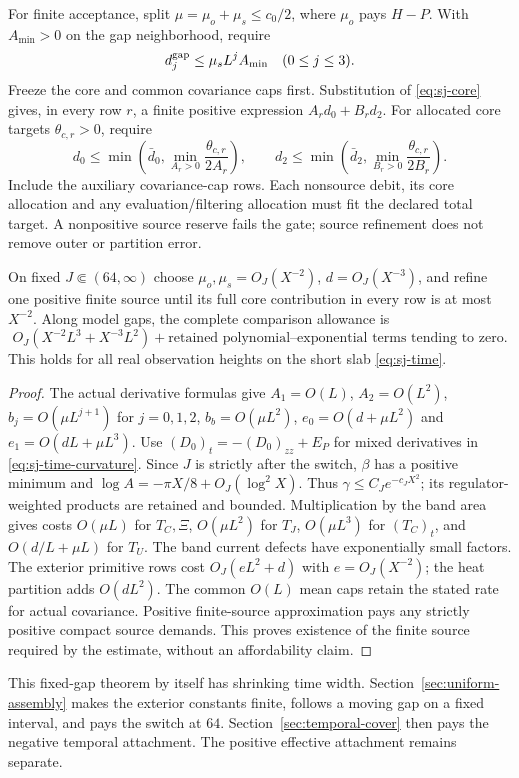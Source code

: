 For finite acceptance, split $\mu=\mu_o+\mu_s\le c_0/2$, where
$\mu_o$ pays $H-P$. With $A_{\min}>0$ on the gap neighborhood, require
\begin{equation}
 d_j^{\rm gap}\le\mu_sL^j A_{\min}\quad(0\le j\le3).
 \label{eq:sj-source-gap}
\end{equation}
Freeze the core and common covariance caps first. Substitution of
\eqref{eq:sj-core} gives, in every row $r$, a finite positive expression
$A_rd_0+B_rd_2$. For allocated core targets $\theta_{c,r}>0$, require
\begin{equation}
 d_0\le\min\left(\bar d_0,\min_{A_r>0}\frac{\theta_{c,r}}{2A_r}\right),
 \qquad
 d_2\le\min\left(\bar d_2,\min_{B_r>0}\frac{\theta_{c,r}}{2B_r}\right).
 \label{eq:sj-source-core}
\end{equation}
Include the auxiliary covariance-cap rows. Each nonsource debit, its
core allocation and any evaluation/filtering allocation must fit the
declared total target. A nonpositive source reserve fails the gate;
source refinement does not remove outer or partition error.

\begin{corollary}\label{cor:sj-rate}
On fixed $J\Subset(64,\infty)$ choose $\mu_o,\mu_s=O_J(X^{-2})$,
$d=O_J(X^{-3})$, and refine one positive finite source until its full
core contribution in every row is at most $X^{-2}$. Along model gaps,
the complete comparison allowance is
\begin{equation}
 O_J(X^{-2}L^3+X^{-3}L^2)
       +\text{retained polynomial--exponential terms tending to zero}.
 \label{eq:sj-rate}
\end{equation}
This holds for all real observation heights on the short slab
\eqref{eq:sj-time}.
\end{corollary}
\begin{proof}
The actual derivative formulas give
$A_1=O(L)$, $A_2=O(L^2)$,
$b_j=O(\mu L^{j+1})$ for $j=0,1,2$,
$b_b=O(\mu L^2)$, $e_0=O(d+\mu L^2)$ and
$e_1=O(dL+\mu L^3)$. Use
$(D_0)_t=-(D_0)_{zz}+E_P$ for mixed derivatives in
\eqref{eq:sj-time-curvature}. Since $J$ is strictly after the switch,
$\beta$ has a positive minimum and
$\log A=-\pi X/8+O_J(\log^2X)$. Thus
$\gamma\le C_Je^{-c_JX^2}$; its regulator-weighted products are
retained and bounded. Multiplication by the band area gives costs
$O(\mu L)$ for $T_C,\Xi$, $O(\mu L^2)$ for $T_J$,
$O(\mu L^3)$ for $(T_C)_t$, and $O(d/L+\mu L)$ for $T_U$.
The band current defects have exponentially small factors. The exterior
primitive rows cost $O_J(eL^2+d)$ with $e=O_J(X^{-2})$; the heat
partition adds $O(dL^2)$. The common $O(L)$ mean caps retain the stated
rate for actual covariance. Positive finite-source approximation pays
any strictly positive compact source demands. This proves existence
of the finite source required by the estimate, without an affordability
claim.
\end{proof}
This fixed-gap theorem by itself has shrinking time width.
Section~\ref{sec:uniform-assembly} makes the exterior constants finite,
follows a moving gap on a fixed interval, and pays the switch at $64$.
Section~\ref{sec:temporal-cover} then pays the negative temporal
attachment. The positive effective attachment remains separate.
